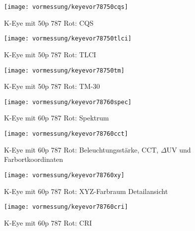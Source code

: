 \documentclass[pagesize,paper=A4,fontsize=12pt,utf8,numbers=noenddot,bibliography=totoc,listof=totoc,DIV=11,BCOR=1mm]{scrreprt}
\begin{document}
\begin{figure}[htp]     %
\centering
\texttt{[image: vormessung/keyevor78750cqs]} 
\caption {K-Eye mit 50p 787 Rot: CQS} 
\end{figure}

\begin{figure}[htp]     %
\centering
\texttt{[image: vormessung/keyevor78750tlci]} 
\caption {K-Eye mit 50p 787 Rot: TLCI} 
\end{figure}

\begin{figure}[htp]     %
\centering
\texttt{[image: vormessung/keyevor78750tm]} 
\caption {K-Eye mit 50p 787 Rot: TM-30} 
\end{figure}




\begin{figure}[htp]     %
\centering
\texttt{[image: vormessung/keyevor78760spec]} 
\caption {K-Eye mit 60p 787 Rot: Spektrum} 
\end{figure}

\begin{figure}[htp]     %
\centering
\texttt{[image: vormessung/keyevor78760cct]} 
\caption {K-Eye mit 60p 787 Rot: Beleuchtungsstärke, CCT, $\Delta$UV und Farbortkoordinaten} 
\end{figure}

\begin{figure}[htp]     %
\centering
\texttt{[image: vormessung/keyevor78760xy]} 
\caption {K-Eye mit 60p 787 Rot: XYZ-Farbraum Detailansicht} 
\end{figure}

\begin{figure}[htp]     %
\centering
\texttt{[image: vormessung/keyevor78760cri]} 
\caption {K-Eye mit 60p 787 Rot: CRI} 
\end{figure}
\end{document}
